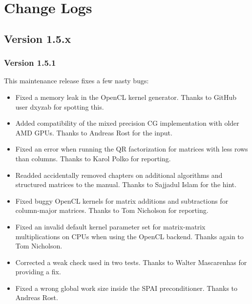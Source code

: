 
\chapter{Change Logs} %

\section*{Version 1.5.x}

\subsection*{Version 1.5.1}
This maintenance release fixes a few nasty bugs:
\begin{itemize}
 \item Fixed a memory leak in the OpenCL kernel generator. Thanks to GitHub user dxyzab for spotting this.
 \item Added compatibility of the mixed precision CG implementation with older AMD GPUs. Thanks to Andreas Rost for the input.
 \item Fixed an error when running the QR factorization for matrices with less rows than columns. Thanks to Karol Polko for reporting.
 \item Readded accidentally removed chapters on additional algorithms and structured matrices to the manual. Thanks to Sajjadul Islam for the hint.
 \item Fixed buggy OpenCL kernels for matrix additions and subtractions for column-major matrices. Thanks to Tom Nicholson for reporting.
 \item Fixed an invalid default kernel parameter set for matrix-matrix multiplications on CPUs when using the OpenCL backend. Thanks again to Tom Nicholson.
 \item Corrected a weak check used in two tests. Thanks to Walter Mascarenhas for providing a fix.
 \item Fixed a wrong global work size inside the SPAI preconditioner. Thanks to Andreas Rost.
\end{itemize}


